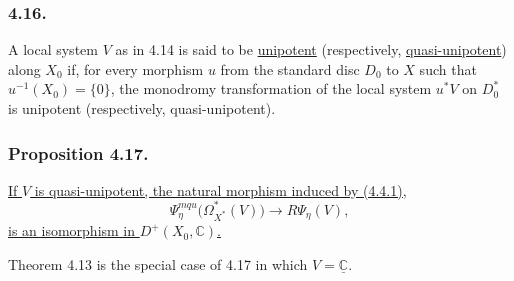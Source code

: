 \subsubsection*{4.16.}
A local system $V$ as in 4.14 is said to be \underline{unipotent}
(respectively, \underline{quasi-unipotent}) along $X_0$ if, for every
morphism $u$ from the standard disc $D_0$ to $X$ such that
$u^{-1}(X_0)=\{0\}$, the monodromy transformation of the local system
$u^*V$ on $D_0^*$ is unipotent (respectively, quasi-unipotent).

\subsubsection*{Proposition 4.17.}
\underline{If $V$ is quasi-unipotent, the natural morphism induced by
(4.4.1),}
\begin{equation}\tag{4.17.1}
\Psi_\eta^{mqu}\bigl(\Omega_{X^*}^*(V)\bigr)
\longrightarrow R\Psi_\eta(V),
\end{equation}
\underline{is an isomorphism in $D^+(X_0,\mathbb C)$.}

Theorem 4.13 is the special case of 4.17 in which
$V=\underline{\mathbb C}$.
